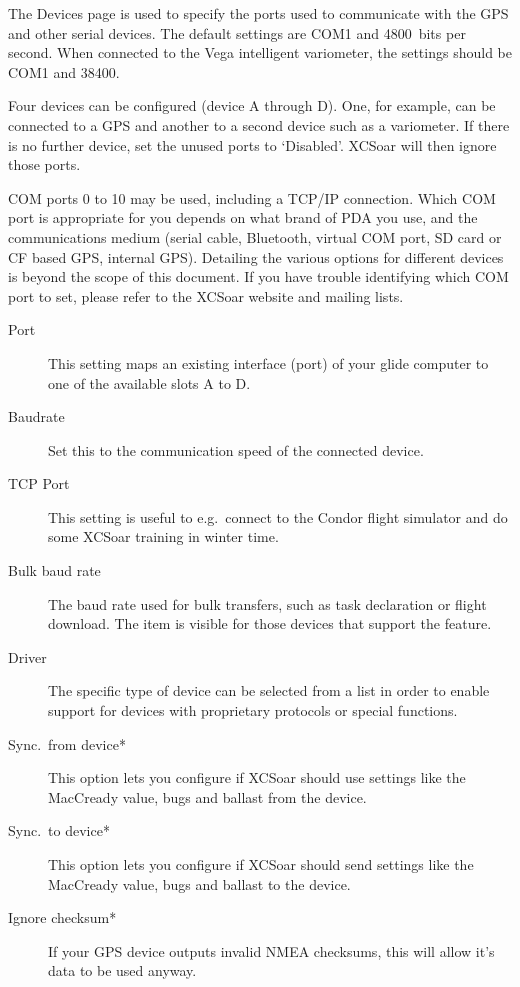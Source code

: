The Devices page is used to specify the ports used to communicate with
the GPS and other serial devices. The default settings are COM1 and
4800~bits per second.  When connected to the Vega intelligent
variometer, the settings should be COM1 and 38400.

Four devices can be configured (device A through D). One, for
example, can be connected to a GPS and another to a
second device such as a variometer.  If there is no further device, 
set the unused ports to `Disabled'.  XCSoar will then ignore those ports.

COM ports 0 to 10 may be used, including a TCP/IP connection.  
Which COM port is appropriate for you
depends on what brand of PDA you use, and the communications medium
(serial cable, Bluetooth, virtual COM port, SD card or CF based GPS,
internal GPS).  Detailing the various options for different devices is
beyond the scope of this document.  If you have trouble identifying
which COM port to set, please refer to the XCSoar website and mailing
lists.

\begin{description}
\item[Port]  This setting maps an existing interface (port) of your 
  glide computer to one of the available slots A to D.
\item[Baudrate]  Set this to the communication speed of the connected device.
\item[TCP Port]  This setting is useful to e.g.\ connect to the Condor flight
  simulator and do some XCSoar training in winter time.
\item[Bulk baud rate]  The baud rate used for bulk transfers, such 
  as task declaration or flight download. The item is visible for those 
  devices that support the feature.
\item[Driver]  The specific type of device can be selected from a list in order
  to enable support for devices with proprietary protocols or special
  functions.
\item[Sync.\ from device*]  This option lets you configure if XCSoar should use settings
  like the MacCready value, bugs and ballast from the device.
\item[Sync.\ to device*]  This option lets you configure if XCSoar should send settings
  like the MacCready value, bugs and ballast to the device.
\item[Ignore checksum*] If your GPS device outputs invalid NMEA checksums, this 
  will allow it's data to be used anyway.
\end{description}
